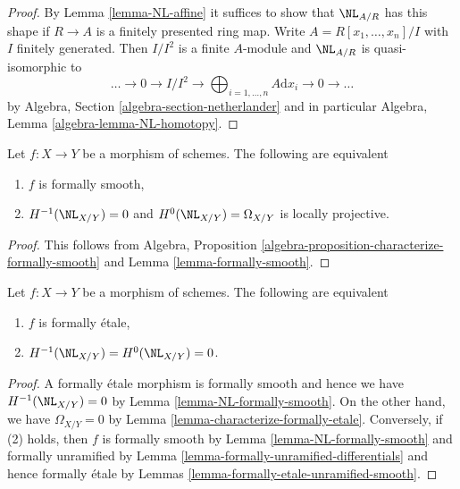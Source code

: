 \begin{proof}
By Lemma \ref{lemma-NL-affine} it suffices to show that $\NL_{A/R}$
has this shape if $R \to A$ is a finitely presented ring map.
Write $A = R[x_1, \ldots, x_n]/I$ with $I$ finitely generated.
Then $I/I^2$ is a finite
$A$-module and $\NL_{A/R}$ is quasi-isomorphic to
$$
\ldots \to 0 \to I/I^2 \to
\bigoplus\nolimits_{i = 1, \ldots, n} A\text{d}x_i \to 0 \to \ldots
$$
by Algebra, Section \ref{algebra-section-netherlander}
and in particular
Algebra, Lemma \ref{algebra-lemma-NL-homotopy}.
\end{proof}

\begin{lemma}
\label{lemma-NL-formally-smooth}
Let $f : X \to Y$ be a morphism of schemes. The following are equivalent
\begin{enumerate}
\item $f$ is formally smooth,
\item $H^{-1}(\NL_{X/Y}) = 0$ and $H^0(\NL_{X/Y}) = \Omega_{X/Y}$
is locally projective.
\end{enumerate}
\end{lemma}

\begin{proof}
This follows from Algebra, Proposition
\ref{algebra-proposition-characterize-formally-smooth}
and Lemma \ref{lemma-formally-smooth}.
\end{proof}

\begin{lemma}
\label{lemma-NL-formally-etale}
Let $f : X \to Y$ be a morphism of schemes. The following are equivalent
\begin{enumerate}
\item $f$ is formally \'etale,
\item $H^{-1}(\NL_{X/Y}) = H^0(\NL_{X/Y}) = 0$.
\end{enumerate}
\end{lemma}

\begin{proof}
A formally \'etale morphism is formally smooth and hence
we have $H^{-1}(\NL_{X/Y}) = 0$ by Lemma \ref{lemma-NL-formally-smooth}.
On the other hand, we have $\Omega_{X/Y} = 0$ by
Lemma \ref{lemma-characterize-formally-etale}.
Conversely, if (2) holds, then $f$ is formally smooth by
Lemma \ref{lemma-NL-formally-smooth}
and formally unramified by
Lemma \ref{lemma-formally-unramified-differentials}
and hence formally \'etale by
Lemmas \ref{lemma-formally-etale-unramified-smooth}.
\end{proof}

